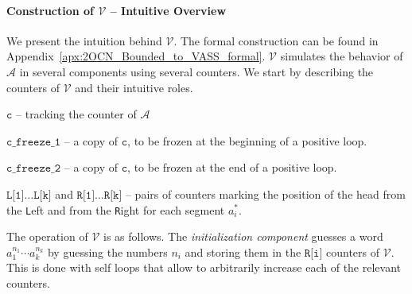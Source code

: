 \documentclass[11pt,a4paper]{amsart}
\theoremstyle{definition}
\newcommand{\vf}[1]{\texttt{#1}}
\newcommand{\cA}{\mathcal{A}}
\newcommand{\cV}{\mathcal{V}}
\begin{document}
\paragraph*{Construction of $\cV$ -- Intuitive Overview} 
We present the intuition behind $\cV$. The formal construction can be found in Appendix~\ref{apx:2OCN_Bounded_to_VASS_formal}.
$\cV$ simulates the behavior of $\cA$ in several components using several counters. We start by describing the counters of $\cV$ and their intuitive roles.
\begin{compactitem}
	\item $\vf{c}$ -- tracking the counter of $\cA$
	\item $\vf{c\_freeze\_1}$ -- a copy of $\vf{c}$, to be frozen at the
	beginning of a positive loop.
	\item $\vf{c\_freeze\_2}$ -- a copy of $\vf{c}$, to be frozen at the end of a
	positive loop.
	\item $\vf{L[1]}\ldots\vf{L[k]}$ and $\vf{R[1]}\ldots\vf{R[k]}$ --  pairs of counters
	marking the position of the head from the \vf{L}eft and from the \vf{R}ight
	for each segment \(a_i^*\).
\end{compactitem}
The operation of $\cV$ is as follows. 
The \emph{initialization component} guesses a word $a_1^{n_1}\cdots a_k^{n_k}$ by guessing the numbers $n_i$ and
storing them in the $\vf{R[i]}$ counters of $\cV$. This is done with self loops that allow to arbitrarily increase each of the relevant counters.
\end{document}
